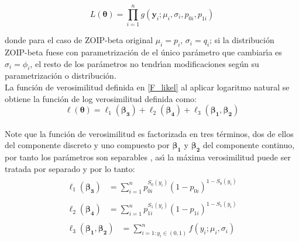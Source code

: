 \begin{equation}
L(\boldsymbol{\theta})=\prod_{i=1}^{n}g(\mathbf{y}_i;\mu_i,\sigma_i,p_{0i},p_{1i}) 
\label{F_likel}
\end{equation}


donde para el caso de ZOIP-beta original $\mu_i=p_i$, $\sigma_i=q_i$; si la distribuci\'{o}n ZOIP-beta fuese con parametrizaci\'{o}n de \cite{Ferrari2} el \'{u}nico par\'{a}metro que cambiar\'{\i}a es $\sigma_i=\phi_i$, el resto de los par\'{a}metros no tendr\'{\i}an modificaciones seg\'{u}n su parametrizaci\'{o}n o distribuci\'{o}n.\\

La funci\'{o}n de verosimilitud definida en \eqref{F_likel} al aplicar logaritmo natural se obtiene la funci\'{o}n de log verosimilitud definida como:
\[
\ell(\boldsymbol{\theta})=\ell_1(\boldsymbol{\beta_3})+\ell_2(\boldsymbol{\beta_4})+\ell_3(\boldsymbol{\beta_1},\boldsymbol{\beta_2})
\]
\\
Note que la funci\'{o}n de verosimilitud es factorizada en tres t\'{e}rminos, dos de ellos del componente discreto y uno compuesto por $\boldsymbol{\beta_1}$ y $\boldsymbol{\beta_2}$ del componente continuo, por tanto los par\'{a}metros son separables \citep{Pace1}, as\'{\i} la m\'{a}xima verosimilitud puede ser tratada por separado y por lo tanto:\\
\begin{align*}
\begin{split}
	\ell_1(\boldsymbol{\beta_3}) &= \sum_{i=1}^{n}{p_{0i}^{S_0(y_i)}(1-p_{0i})^{1-S_0(y_i)}}
\end{split}\\
\begin{split}
	\ell_2(\boldsymbol{\beta_4}) &= \sum_{i=1}^{n}{p_{1i}^{S_1(y_i)}(1-p_{1i})^{1-S_1(y_i)}}
\end{split}\\
\begin{split}
	\ell_3(\boldsymbol{\beta_1},\boldsymbol{\beta_2}) &= \sum_{i=1:y_i \in (0,1)}^{n}{f(y_i;\mu_i,\sigma_i)} 
\end{split}
\end{align*}

